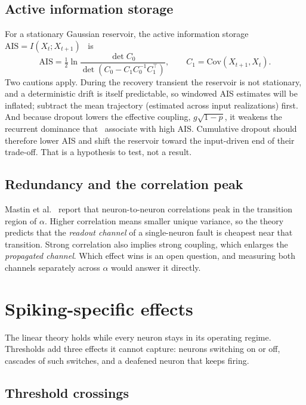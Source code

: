 \documentclass[11pt,a4paper]{article}
\newcommand{\Cov}{\mathrm{Cov}}
\begin{document}
\subsection{Active information storage}

For a stationary Gaussian reservoir, the active information storage $\mathrm{AIS} = I(X_t; X_{t+1})$~\cite{lizier2012} is
\begin{equation}
\mathrm{AIS} = \tfrac{1}{2} \ln \frac{\det C_0}{\det\!\left( C_0 - C_1 C_0^{-1} C_1^{\top} \right)}, \qquad C_1 = \Cov(X_{t+1}, X_t).
\label{eq:ais}
\end{equation}
Two cautions apply. During the recovery transient the reservoir is not stationary, and a deterministic drift is itself predictable, so windowed AIS estimates will be inflated; subtract the mean trajectory (estimated across input realizations) first. And because dropout lowers the effective coupling, $g\sqrt{1-p}$, it weakens the recurrent dominance that~\cite{mastin2026} associate with high AIS. Cumulative dropout should therefore lower AIS and shift the reservoir toward the input-driven end of their trade-off. That is a hypothesis to test, not a result.

\subsection{Redundancy and the correlation peak}

Mastin et al.~\cite{mastin2026} report that neuron-to-neuron correlations peak in the transition region of $\alpha$. Higher correlation means smaller unique variance, so the theory predicts that the \emph{readout channel} of a single-neuron fault is cheapest near that transition. Strong correlation also implies strong coupling, which enlarges the \emph{propagated channel}. Which effect wins is an open question, and measuring both channels separately across $\alpha$ would answer it directly.

\section{Spiking-specific effects}

The linear theory holds while every neuron stays in its operating regime. Thresholds add three effects it cannot capture: neurons switching on or off, cascades of such switches, and a deafened neuron that keeps firing.

\subsection{Threshold crossings}
\label{sec:threshold}
\end{document}
